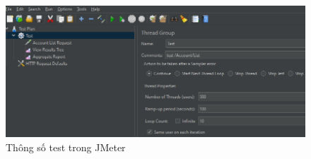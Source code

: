 \documentclass[14pt]{article}
\begin{document}
\begin{figure}
    \centering
    \includegraphics[width=0.5\linewidth]{images/testjmeter.png}
    \caption{Thông số test trong JMeter}
    \label{fig:testjmeter}
\end{figure}


    
    
   
    \pagebreak 
    
    
    \nocite{*}

    
\end{document}
